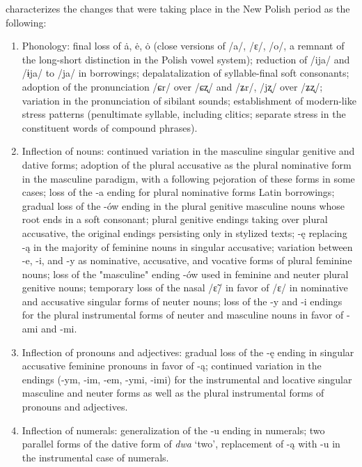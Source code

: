 \citet{klemensiewicz_76} characterizes the changes that were taking place in the New Polish period as the following:
\begin{enumerate}
    \item Phonology: final loss of ȧ, ė, ȯ (close versions of /a/, /ɛ/, /o/, a remnant of the long-short distinction in the Polish vowel system); reduction of /ija/ and /ɨja/ to /ja/ in borrowings; depalatalization of syllable-final soft consonants; adoption of the pronunciation /ɕr/ over /ɕʐ/ and /ʑr/, /jʐ/ over /ʑʐ/; variation in the pronunciation of sibilant sounds; establishment of modern-like stress patterns (penultimate syllable, including clitics; separate stress in the constituent words of compound phrases). 
    
    \item Inflection of nouns: continued variation in the masculine singular genitive and dative forms; adoption of the plural accusative as the plural nominative form in the masculine paradigm, with a following pejoration of these forms in some cases; loss of the -a ending for plural nominative forms Latin borrowings; gradual loss of the -ów ending in the plural genitive masculine nouns whose root ends in a soft consonant; plural genitive endings taking over plural accusative, the original endings persisting only in stylized texts; -ę replacing -ą in the majority of feminine nouns in singular accusative; variation between -e, -i, and -y as nominative, accusative, and vocative forms of plural feminine nouns; loss of the "masculine" ending -ów used in feminine and neuter plural genitive nouns; temporary loss of the nasal /ɛ̃/ in favor of /ɛ/ in nominative and accusative singular forms of neuter nouns; loss of the -y and -i endings for the plural instrumental forms of neuter and masculine nouns in favor of -ami and -mi.
    
    \item Inflection of pronouns and adjectives: gradual loss of the -ę ending in singular accusative feminine pronouns in favor of -ą; continued variation in the endings (-ym, -im, -em, -ymi, -imi) for the instrumental and locative singular masculine and neuter forms as well as the plural instrumental forms of pronouns and adjectives.
    
    \item Inflection of numerals: generalization of the -u ending in numerals; two parallel forms of the dative form of \textit{dwa} `two', replacement of -ą with -u in the instrumental case of numerals.
    

\end{enumerate}
